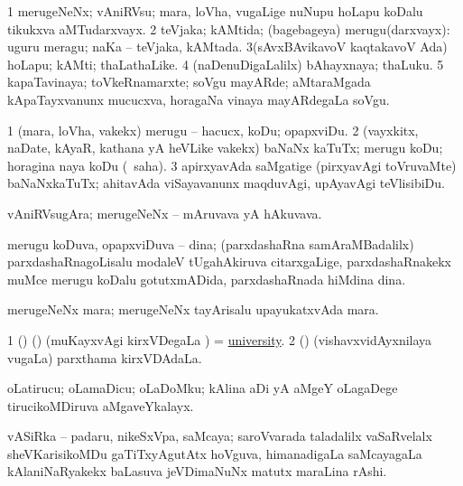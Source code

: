 \bentry
{} 
\gl{\nA}
\expl{}
\bmng
\bnum
\num{1} merugeNeNx; vAniRVsu; mara, loVha, \mo vugaLige nuNupu hoLapu koDalu tikukxva aMTudarxvayx. 
\num{2} teVjaka; kAMtida; (bagebageya) merugu(darxvayx):  uguru meragu; naKa -- teVjaka, kAMtada. 
\num{3}(sAvxBAvikavoV kaqtakavoV Ada) hoLapu; kAMti; thaLathaLike. 
\num{4} (naDenuDigaLalilx) bAhayxnaya; thaLuku. 
\num{5} kapaTavinaya; toVkeRnamarxte; soVgu mayARde; aMtaraMgada kApaTayxvanunx mucucxva, horagaNa vinaya mayARdegaLa soVgu. 
\enum
\emng
\eentry

\bentry
{} 
\gl{\sakirx}
\expl{}
\bmng
\bnum
\num{1} (mara, loVha, \mo vakekx) merugu -- hacucx, koDu; opapxviDu. 
\num{2} (vayxkitx, naDate, kAyaR, kathana yA heVLike \mo vakekx) baNaNx kaTuTx; merugu koDu; horagina naya koDu (\akirx\ saha). 
\num{3} apirxyavAda saMgatige (pirxyavAgi toVruvaMte) baNaNxkaTuTx; ahitavAda viSayavanunx maqduvAgi, upAyavAgi teVlisibiDu. 
\enum
\emng
\eentry

\bentry
{} 
\gl{\nA}
\expl{}
\bmng
 vAniRVsugAra; merugeNeNx -- mAruvava yA hAkuvava. 
\emng
\eentry

\bentry
{} 
\gl{\nA}
\expl{}
\bmng
 merugu koDuva, opapxviDuva -- dina; (parxdashaRna samAraMBadalilx) parxdashaRnagoLisalu modaleV tUgahAkiruva citarxgaLige, parxdashaRnakekx muMce merugu koDalu gotutxmADida, parxdashaRnada hiMdina dina. 
\emng
\eentry

\bentry
{}
\gl{\nA}
\expl{}
\bmng
 merugeNeNx mara; merugeNeNx tayArisalu upayukatxvAda mara. 
\emng
\eentry

\bentry
{} 
\gl{\nA}
\bmng
\bnum
\num{1} (\birx) (\AmA) (muKayxvAgi kirxVDegaLa \vi) = \hyperref{kandict_u.pdf}{U}{university}{university}. 
\num{2} (\ame) (vishavxvidAyxnilaya \mo vugaLa) parxthama kirxVDAdaLa. 
\enum
\emng
\eentry

\bentry
{} 
\gl{\nA}
\expl{}
\bmng
 oLatirucu; oLamaDicu; oLaDoMku; kAlina aDi yA aMgeY oLagaDege tirucikoMDiruva aMgaveYkalayx. 
\emng
\eentry

\bentry
{} 
\gl{\nA}
\expl{}
\bmng
 vASiRka -- padaru, nikeSxVpa, saMcaya; saroVvarada taladalilx vaSaRvelalx sheVKarisikoMDu gaTiTxyAgutAtx hoVguva, himanadigaLa saMcayagaLa kAlaniNaRyakekx baLasuva jeVDimaNuNx matutx maraLina rAshi. 
\emng
\eentry

